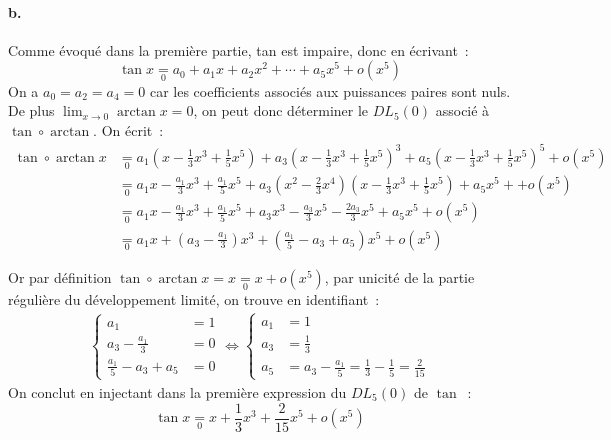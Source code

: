 \documentclass{article}
\newcommand{\oo}[1]{+ o\!\left(#1\right)}
\begin{document}
    \paragraph{b.} Comme évoqué dans la première partie, tan est impaire, donc en écrivant~:
    \begin{displaymath}
      \tan x \underset{0}{=} a_0 + a_1x + a_2x^2 + \dotsb + a_5x^5 \oo{x^5}
    \end{displaymath}
    On a $a_0 = a_2 = a_4 = 0$ car les coefficients associés aux puissances paires sont nuls. De plus $\lim_{x\to 0} \arctan x = 0$, on peut donc déterminer le $DL_5(0)$ associé à $\tan\circ\arctan$. On écrit~:
    \begin{align*}
      \tan\circ\arctan x &\underset{0}{=} a_1\left(x - \frac{1}{3}x^3 + \frac{1}{5}x^5\right) + a_3\left(x - \frac{1}{3}x^3 + \frac{1}{5}x^5\right)^3 + a_5\left(x - \frac{1}{3}x^3 + \frac{1}{5}x^5\right)^5 \oo{x^5} \\
      &\underset{0}{=} a_1x - \frac{a_1}{3}x^3 + \frac{a_1}{5}x^5 + a_3\left(x^2 - \frac{2}{3}x^4\right)\left(x - \frac{1}{3}x^3 + \frac{1}{5}x^5\right) + a_5x^5 +\oo{x^5} \\
      &\underset{0}{=} a_1x - \frac{a_1}{3}x^3 + \frac{a_1}{5}x^5 + a_3x^3 - \frac{a_3}{3}x^5 - \frac{2a_3}{3}x^5 + a_5x^5 \oo{x^5} \\
      &\underset{0}{=} a_1x + \left(a_3 - \frac{a_1}{3}\right)x^3 + \left(\frac{a_1}{5} - a_3 + a_5\right)x^5 \oo{x^5}
    \end{align*}

    Or par définition $\tan\circ\arctan x = x \underset{0}{=} x \oo{x^5}$, par unicité de la partie régulière du développement limité, on trouve en identifiant~:
    \begin{align*}
      \left\{
        \begin{array}{rl}
          a_1  &= 1 \\
          a_3 - \frac{a_1}{3} &= 0 \\
          \frac{a_1}{5} - a_3 + a_5 &= 0
        \end{array}
      \right.
      \iff\left\{
        \begin{array}{rl}
          a_1  &= 1 \\
          a_3 &= \frac{1}{3} \\
          a_5 &= a_3 - \frac{a_1}{5} = \frac{1}{3} - \frac{1}{5} = \frac{2}{15}
        \end{array}
      \right.
    \end{align*}
    On conclut en injectant dans la première expression du $DL_5(0)$ de $\tan$~:
    \begin{displaymath}
      \tan x \underset{0}{=} x + \frac{1}{3}x^3 + \frac{2}{15}x^5 \oo{x^5}
    \end{displaymath}
\end{document}
